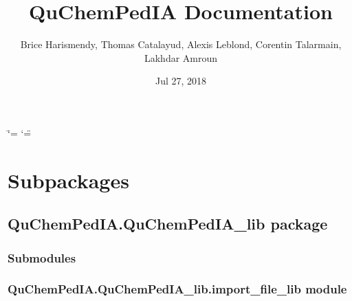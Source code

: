 \documentclass[letterpaper,10pt,english]{sphinxmanual}
\title{QuChemPedIA Documentation}
\date{Jul 27, 2018}
\author{Brice Harismendy, Thomas Catalayud, Alexis Leblond, Corentin Talarmain, Lakhdar Amroun}
\begin{document}
\ifdefined\shorthandoff
  \ifnum\catcode`\=\string=\active\shorthandoff{=}\fi
  \ifnum\catcode`\"=\active{}\fi
\fi
\maketitle
\sphinxtableofcontents
{}\label{\detokenize{QuChemPedIA::doc}}



\chapter{Subpackages}
\label{\detokenize{QuChemPedIA:subpackages}}

\section{QuChemPedIA.QuChemPedIA\_lib package}
\label{\detokenize{QuChemPedIA.QuChemPedIA_lib:quchempedia-quchempedia-lib-package}}\label{\detokenize{QuChemPedIA.QuChemPedIA_lib::doc}}

\subsection{Submodules}
\label{\detokenize{QuChemPedIA.QuChemPedIA_lib:submodules}}

\subsection{QuChemPedIA.QuChemPedIA\_lib.import\_file\_lib module}
\label{\detokenize{QuChemPedIA.QuChemPedIA_lib:module-QuChemPedIA.QuChemPedIA_lib.import_file_lib}}\label{\detokenize{QuChemPedIA.QuChemPedIA_lib:quchempedia-quchempedia-lib-import-file-lib-module}}

\begin{fulllineitems}
\label{\detokenize{QuChemPedIA.QuChemPedIA_lib:QuChemPedIA.QuChemPedIA_lib.import_file_lib.clean_file}}
\end{fulllineitems}

\end{document}
